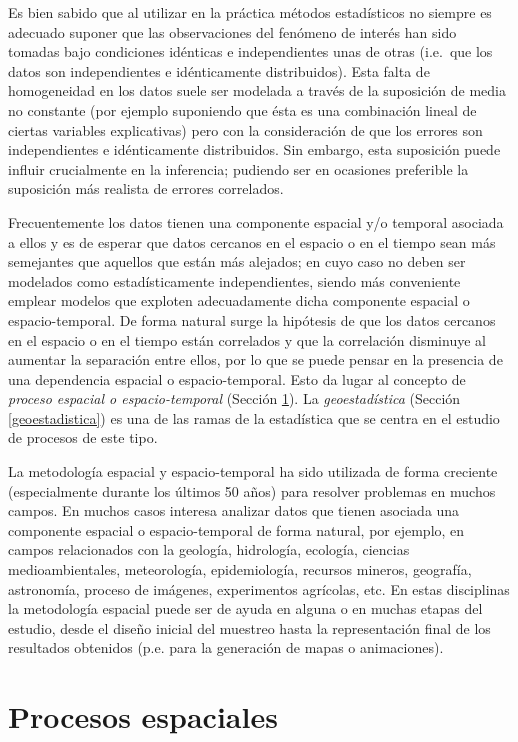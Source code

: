\documentclass[
  spanish,
]{book}
\theoremstyle{break}
\begin{document}
Es bien sabido que al utilizar en la práctica métodos estadísticos no siempre es adecuado suponer que las observaciones del fenómeno de interés han sido tomadas bajo condiciones idénticas e independientes unas de otras (i.e.~que los datos son independientes e idénticamente distribuidos).
Esta falta de homogeneidad en los datos suele ser modelada a través de la suposición de media no constante (por ejemplo suponiendo que ésta es una combinación lineal de ciertas variables explicativas) pero con la consideración de que los errores son independientes e idénticamente distribuidos.
Sin embargo, esta suposición puede influir crucialmente en la inferencia; pudiendo ser en ocasiones preferible la suposición más realista de errores correlados.

Frecuentemente los datos tienen una componente espacial y/o temporal asociada a ellos y es de esperar que datos cercanos en el espacio o en el tiempo sean más semejantes que aquellos que están más alejados; en cuyo caso no deben ser modelados como estadísticamente independientes, siendo más conveniente emplear modelos que exploten adecuadamente dicha componente espacial o espacio-temporal.
De forma natural surge la hipótesis de que los datos cercanos en el espacio o en el tiempo están correlados y que la correlación disminuye al aumentar la separación entre ellos, por lo que se puede pensar en la presencia de una dependencia espacial o espacio-temporal.
Esto da lugar al concepto de \emph{proceso espacial o espacio-temporal} (Sección \ref{proc-esp}).
La \emph{geoestadística} (Sección \ref{geoestadistica}) es una de las ramas de la estadística que se centra en el estudio de procesos de este tipo.

La metodología espacial y espacio-temporal ha sido utilizada de forma creciente (especialmente durante los últimos 50 años) para resolver problemas en muchos campos.
En muchos casos interesa analizar datos que tienen asociada una componente espacial o espacio-temporal de forma natural, por ejemplo, en campos relacionados con la geología, hidrología, ecología, ciencias medioambientales, meteorología, epidemiología, recursos mineros, geografía, astronomía, proceso de imágenes, experimentos agrícolas, etc.
En estas disciplinas la metodología espacial puede ser de ayuda en alguna o en muchas etapas del estudio, desde el diseño inicial del muestreo hasta la representación final de los resultados obtenidos (p.e. para la generación de mapas o animaciones).

\hypertarget{proc-esp}{%
\section{Procesos espaciales}\label{proc-esp}}
\end{document}

